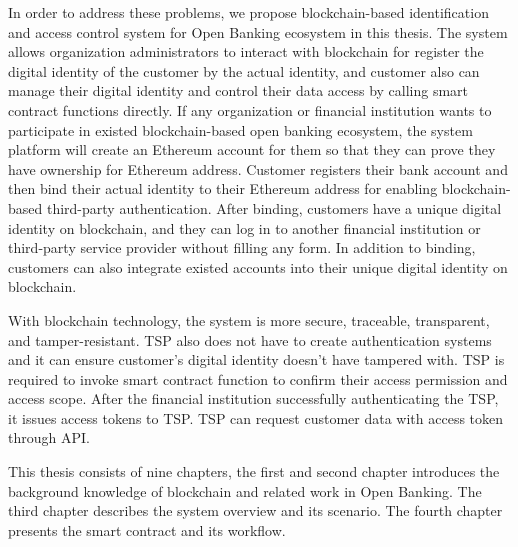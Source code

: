 In order to address these problems, we propose blockchain-based identification and access control system for Open Banking ecosystem in this thesis. The system allows organization administrators to interact with blockchain for register the digital identity of the customer by the actual identity, and customer also can manage their digital identity and control their data access by calling smart contract functions directly. If any organization or financial institution wants to participate in existed blockchain-based open banking ecosystem, the system platform will create an Ethereum account for them so that they can prove they have ownership for Ethereum address. Customer registers their bank account and then bind their actual identity to their Ethereum address for enabling blockchain-based third-party authentication. After binding, customers have a unique digital identity on blockchain, and they can log in to another financial institution or third-party service provider without filling any form. In addition to binding, customers can also integrate existed accounts into their unique digital identity on blockchain.\par
With blockchain technology, the system is more secure, traceable, transparent, and tamper-resistant. TSP also does not have to create authentication systems and it can ensure customer's digital identity doesn't have tampered with. TSP is required to invoke smart contract function to confirm their access permission and access scope. After the financial institution successfully authenticating the TSP, it issues access tokens to TSP. TSP can request customer data with access token through API.\par
This thesis consists of nine chapters, the first and second chapter introduces the background knowledge of blockchain and related work in Open Banking. The third chapter describes the system overview and its scenario. The fourth chapter presents the smart contract and its workflow.\par